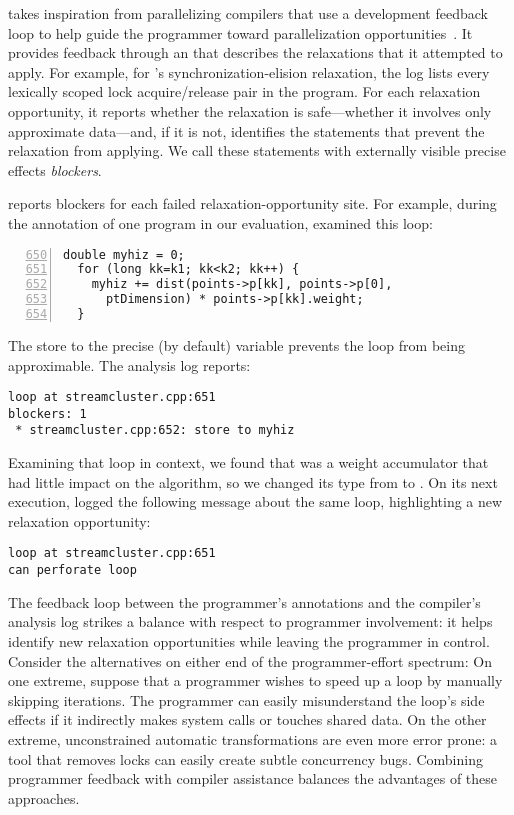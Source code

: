\sysname takes inspiration from parallelizing compilers that use a development
feedback loop to help guide the programmer toward parallelization
opportunities~\cite{canal, deditor}.
It provides
feedback through an  that describes the relaxations that it
attempted to apply. For example, for \sysname's synchronization-elision
relaxation, the log lists every lexically scoped lock acquire/release pair in
the program. For each relaxation opportunity, it reports whether the relaxation
is safe---whether it involves only approximate data---and, if it is
not, identifies the statements that prevent the relaxation from applying.
We call these statements with
externally visible precise effects \emph{blockers}.

\sysname reports blockers for each failed
relaxation-opportunity site. For example, during the annotation of one program
in our evaluation, \sysname examined this loop:
%
\begin{lstlisting}[numbers=left,firstnumber=650,numbersep=-1pt,numberstyle=\sffamily]
  double myhiz = 0;
  for (long kk=k1; kk<k2; kk++) {
    myhiz += dist(points->p[kk], points->p[0],
      ptDimension) * points->p[kk].weight;
  }
\end{lstlisting}
%
The store to the precise (by default) variable 
prevents the loop from being approximable. The analysis log reports:
%
\begin{lstlisting}
loop at streamcluster.cpp:651
blockers: 1
 * streamcluster.cpp:652: store to myhiz
\end{lstlisting}
%
Examining that loop in context, we found that  was a weight
accumulator that had little impact on the algorithm, so we changed its type from
 to . On its next execution, \sysname logged the
following message about the same loop, highlighting a new relaxation
opportunity:
%
\begin{lstlisting}
loop at streamcluster.cpp:651
can perforate loop
\end{lstlisting}
%
The feedback loop between the programmer's annotations and the compiler's
analysis log strikes a balance with respect to programmer involvement: it helps
identify new relaxation opportunities while leaving the programmer in control.
%
Consider the alternatives on either end of the programmer-effort spectrum:
On one extreme, suppose that a programmer wishes to speed up a loop by manually
skipping iterations.  The programmer can easily misunderstand the loop's side
effects if it indirectly makes system calls or touches shared data.
%
On the other extreme, unconstrained automatic transformations are even more
error prone: a tool that removes locks can easily create subtle concurrency
bugs.
%
Combining programmer feedback with compiler assistance balances the
advantages of these approaches.
